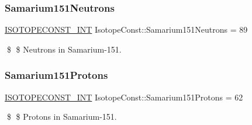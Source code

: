 \subsubsection{\texorpdfstring{Samarium151\+Neutrons}{Samarium151Neutrons}}
{\footnotesize\ttfamily \mbox{\hyperlink{group___isotope_const-_macros_ga5f18360b3e99483a35c32d789e62621c}{I\+S\+O\+T\+O\+P\+E\+C\+O\+N\+S\+T\+\_\+\+I\+NT}} Isotope\+Const\+::\+Samarium151\+Neutrons = 89}

\$ \$ Neutrons in Samarium-\/151. \mbox{\label{group___isotope_const-_samarium-_sm151_ga84b78975cd2dab05ebedae838ddc4f6b}} 
\subsubsection{\texorpdfstring{Samarium151\+Protons}{Samarium151Protons}}
{\footnotesize\ttfamily \mbox{\hyperlink{group___isotope_const-_macros_ga5f18360b3e99483a35c32d789e62621c}{I\+S\+O\+T\+O\+P\+E\+C\+O\+N\+S\+T\+\_\+\+I\+NT}} Isotope\+Const\+::\+Samarium151\+Protons = 62}

\$ \$ Protons in Samarium-\/151. 